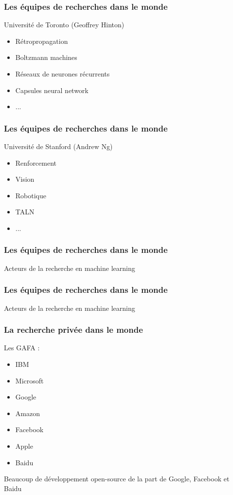 \documentclass{formation}
\begin{document}
\begin{frame}
  \frametitle{Les équipes de recherches dans le monde}
  Université de Toronto (Geoffrey Hinton) 
  \begin{minipage}[c]{0.50\linewidth}
  \begin{itemize}
  \item Rétropropagation
  \item Boltzmann machines
  \item Réseaux de neurones récurrents
  \item Capsules neural network
  \item ...
  \end{itemize}
  \end{minipage}\hfill
  \begin{minipage}[c]{0.49\linewidth}
  \end{minipage}\hfill
\end{frame}

\begin{frame}
  \frametitle{Les équipes de recherches dans le monde}
  Université de Stanford (Andrew Ng)
  \newline
  \begin{minipage}[c]{0.50\linewidth}
  \begin{itemize}
  \item Renforcement
  \item Vision
  \item Robotique
  \item TALN
  \item ...
  \end{itemize}
  \end{minipage}\hfill
  \begin{minipage}[c]{0.49\linewidth}
  \end{minipage}\hfill
\end{frame}

\begin{frame}
  \frametitle{Les équipes de recherches dans le monde}
  Acteurs de la recherche en machine learning
\end{frame}

\begin{frame}
  \frametitle{Les équipes de recherches dans le monde}
  Acteurs de la recherche en machine learning
\end{frame}

\begin{frame}
  \frametitle{La recherche privée dans le monde}
  Les GAFA :
  \begin{itemize}
  \item IBM
  \item Microsoft
  \item Google
  \item Amazon
  \item Facebook
  \item Apple
  \item Baidu
  \end{itemize}
  Beaucoup de développement open-source de la part de Google, Facebook et Baidu
\end{frame}
\end{document}
